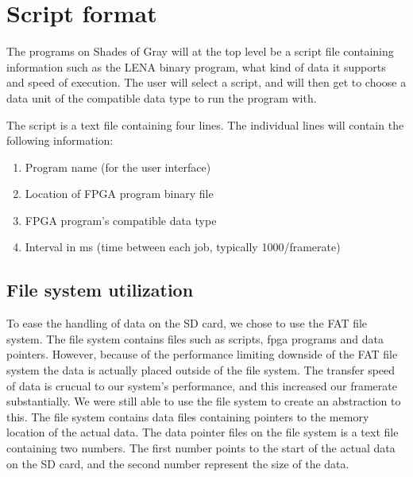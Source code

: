 \section{Script format}

The programs on { Shades of Gray} will at the top level be a script file containing information such as the LENA binary program, what kind of data it supports and speed of execution. The user will select a script, and will then get to choose a data unit of the compatible data type to run the program with.

The script is a text file containing four lines. The individual lines will contain the following information:

\begin{enumerate}
\item Program name (for the user interface)
\item Location of FPGA program binary file
\item FPGA program's compatible data type
\item Interval in ms (time between each job, typically 1000/framerate)
\end{enumerate}

\subsection{File system utilization}
{
To ease the handling of data on the SD card, we chose to use the FAT file system. The file system contains files such as scripts, fpga programs and data pointers. However, because of the performance limiting downside of the FAT file system the data is actually placed outside of the file system. The transfer speed of data is crucual to our system's performance, and this increased our framerate substantially. We were still able to use the file system to create an abstraction to this. The file system contains data files containing pointers to the memory location of the actual data. The data pointer files on the file system is a text file containing two numbers. The first number points to the start of the actual data on the SD card, and the second number represent the size of the data.
}


